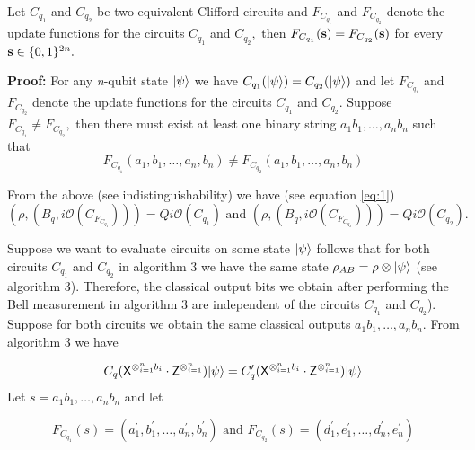 \begin{theorem}\label{sec:Clifford Functions}
Let $C_{q_1}$ and $C_{q_2}$ be two equivalent Clifford circuits and  $F_{C_{q_1}}$ and $F_{C_{q_2}}$  denote the update functions for the circuits $C_{q_1}$ and $C_{q_2},$ then $F_{C_{q_1}}({\bf s})=F_{C_{q_2}}({\bf s})$ for every ${\bf s}\in\{0,1\}^{2n}.$
\end{theorem}

\begin{flushleft}
{\bf Proof:} For any {\em n}-qubit state ${\lvert}\psi\rangle$ we have $C_{q_1}({\lvert}\psi\rangle)=C_{q_2}({\lvert}\psi\rangle)$ and let $F_{C_{q_1}}$ and $F_{C_{q_2}}$ denote the update functions for the circuits $C_{q_1}$ and $C_{q_2}.$ Suppose $F_{C_{q_1}}\neq F_{C_{q_2}},$  then there must exist at least one binary string $a_1b_1,\ldots, a_nb_n$ such that
\begin{equation*}
F_{C_{q_1}}(a_1,b_1,\ldots,a_n,b_n)\neq F_{C_{q_2}}(a_1,b_1,\ldots,a_n,b_n)
\end{equation*}

From the above (see indistinguishability) we have (see equation \ref{eq:1})
\begin{equation*}
\left(\rho ,\left(B_q, i\mathcal{O}(C_{F_{C_{q_1}}})\right)\right)= Qi\mathcal{O}(C_{q_1}) \mbox{ and } \left(\rho ,\left(B_q, i\mathcal{O}(C_{F_{C_{q_2}}})\right)\right)= Qi\mathcal{O}(C_{q_2}).
\end{equation*}

Suppose we want to evaluate circuits on some state ${\lvert}\psi\rangle$ follows that for both circuits $C_{q_1}$ and $C_{q_2}$ in algorithm 3 we have the same state $\rho_{AB}=\rho\otimes {\lvert}\psi\rangle$ (see algorithm 3). Therefore, the classical output bits we obtain after performing the Bell measurement in algorithm 3 are independent of the circuits $C_{q_1}$ and $C_{q_2}$). Suppose for both circuits we obtain the same classical outputs $a_1b_1,\ldots, a_nb_n.$ From algorithm 3 we have

 \begin{equation}
  \label{eq:2}
C_q({\sf X}^{\otimes_{i=1}^{n} b_{i}} \cdot {\sf Z}^{\otimes_{i=1}^{n}}){\lvert}\psi\rangle=C_q^\prime ({\sf X}^{\otimes_{i=1}^{n} b_{i}} \cdot {\sf Z}^{\otimes_{i=1}^{n}}){\lvert}\psi\rangle
\end{equation}
Let $s=a_1b_1,\ldots, a_nb_n$ and let

 \begin{equation}
 \label{eq:3}
F_{C_{q_1}}(s)=(a^\prime_1,b^\prime_1,\ldots, a^\prime_n,b^\prime_n) \mbox{ and } F_{C_{q_2}}(s)=(d_1^\prime,e_1^\prime,\ldots, d_n^\prime,e^\prime_n)
\end{equation}


\end{flushleft}
